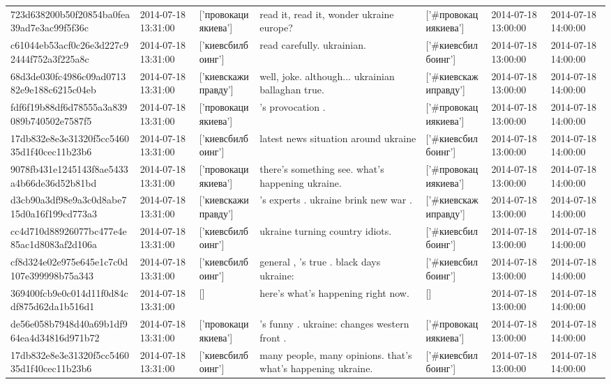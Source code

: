 \begin{tabular}{lllllll}
723d638200b50f20854ba0fea39ad7e3ac99f5f36c & 2014-07-18 13:31:00 & ['провокациякиева'] & read it, read it, wonder ukraine europe? & ['#провокациякиева'] & 2014-07-18 13:00:00 & 2014-07-18 14:00:00 \\
c61044eb53acf0c26e3d227c92444f752a3f225a8c & 2014-07-18 13:31:00 & ['киевсбилбоинг'] & read carefully. ukrainian. & ['#киевсбилбоинг'] & 2014-07-18 13:00:00 & 2014-07-18 14:00:00 \\
68d3de030fc4986c09ad071382e9e188c6215c04eb & 2014-07-18 13:31:00 & ['киевскажиправду'] & well, joke. although... ukrainian ballaghan true. & ['#киевскажиправду'] & 2014-07-18 13:00:00 & 2014-07-18 14:00:00 \\
fdf6f19b88df6d78555a3a839089b740502e7587f5 & 2014-07-18 13:31:00 & ['провокациякиева'] & 's provocation . & ['#провокациякиева'] & 2014-07-18 13:00:00 & 2014-07-18 14:00:00 \\
17db832e8e3e31320f5cc546035d1f40cec11b23b6 & 2014-07-18 13:31:00 & ['киевсбилбоинг'] & latest news situation around ukraine & ['#киевсбилбоинг'] & 2014-07-18 13:00:00 & 2014-07-18 14:00:00 \\
9078fb431e1245143f8ae5433a4b66de36d52b81bd & 2014-07-18 13:31:00 & ['провокациякиева'] & there's something see. what's happening ukraine. & ['#провокациякиева'] & 2014-07-18 13:00:00 & 2014-07-18 14:00:00 \\
d3cb90a3df98e9a3c0d8abe715d0a16f199cd773a3 & 2014-07-18 13:31:00 & ['киевскажиправду'] & 's experts . ukraine brink new war . & ['#киевскажиправду'] & 2014-07-18 13:00:00 & 2014-07-18 14:00:00 \\
cc4d710d88926077bc477e4e85ac1d8083af2d106a & 2014-07-18 13:31:00 & ['киевсбилбоинг'] & ukraine turning country idiots. & ['#киевсбилбоинг'] & 2014-07-18 13:00:00 & 2014-07-18 14:00:00 \\
cf8d324e02e975e645e1c7c0d107e399998b75a343 & 2014-07-18 13:31:00 & ['киевсбилбоинг'] & general , 's true . black days ukraine: & ['#киевсбилбоинг'] & 2014-07-18 13:00:00 & 2014-07-18 14:00:00 \\
369400fcb9e0c014d11f0d84cdf875d62da1b516d1 & 2014-07-18 13:31:00 & [] & here's what's happening right now. & [] & 2014-07-18 13:00:00 & 2014-07-18 14:00:00 \\
de56e058b7948d40a69b1df964ea4d34816d971b72 & 2014-07-18 13:31:00 & ['провокациякиева'] & 's funny . ukraine: changes western front . & ['#провокациякиева'] & 2014-07-18 13:00:00 & 2014-07-18 14:00:00 \\
17db832e8e3e31320f5cc546035d1f40cec11b23b6 & 2014-07-18 13:31:00 & ['киевсбилбоинг'] & many people, many opinions. that's what's happening ukraine. & ['#киевсбилбоинг'] & 2014-07-18 13:00:00 & 2014-07-18 14:00:00 \\

\end{tabular}
